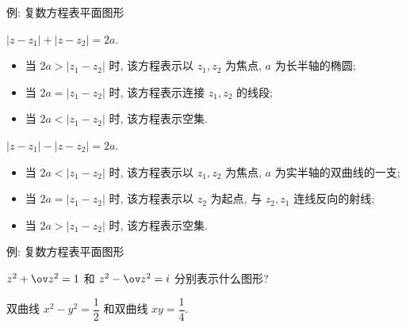 \begin{frame}{例: 复数方程表平面图形}
	\onslide<+->
	\begin{example}
		$|z-z_1|+|z-z_2|=2a$.
		\begin{itemize}
			\item 当 $2a>|z_1-z_2|$ 时, 该方程表示以 $z_1,z_2$ 为焦点, $a$ 为长半轴的椭圆;
			\item 当 $2a=|z_1-z_2|$ 时, 该方程表示连接 $z_1,z_2$ 的线段;
			\item 当 $2a<|z_1-z_2|$ 时, 该方程表示空集.	
		\end{itemize}
	\end{example}
	\onslide<+->
	\begin{example}
		$|z-z_1|-|z-z_2|=2a$.
		\begin{itemize}
			\item 当 $2a<|z_1-z_2|$ 时, 该方程表示以 $z_1,z_2$ 为焦点, $a$ 为实半轴的双曲线的一支;
			\item 当 $2a=|z_1-z_2|$ 时, 该方程表示以 $z_2$ 为起点, 与 $z_2,z_1$ 连线反向的射线;
			\item 当 $2a>|z_1-z_2|$ 时, 该方程表示空集.	
		\end{itemize}
	\end{example}
\end{frame}


\begin{frame}{例: 复数方程表平面图形}
	\onslide<+->
	\begin{exercise}
		$z^2+\ov z^2=1$ 和 $z^2-\ov z^2=i$ 分别表示什么图形?
	\end{exercise}

	\onslide<+->
	\begin{answer}
		双曲线 $x^2-y^2=\dfrac12$ 和双曲线 $xy=\dfrac14$.
	\end{answer}
\end{frame}


